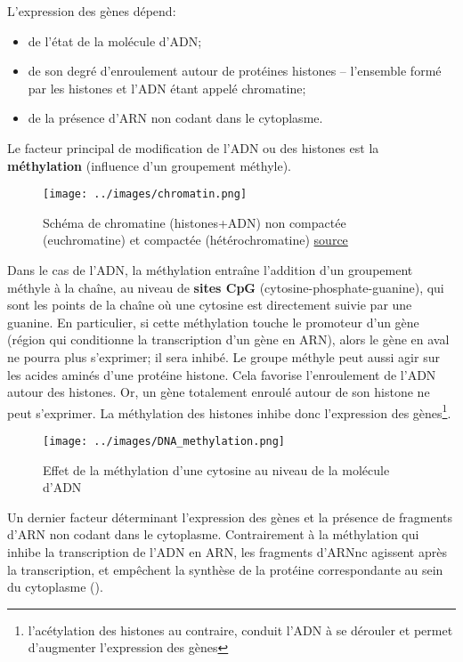 \documentclass[french]{article}
\begin{document}
				L'expression des gènes dépend:
				\begin{itemize}
					\item de l'état de la molécule d'ADN;
					\item de son degré d'enroulement autour de protéines histones -- l'ensemble formé par les histones et l'ADN étant appelé chromatine;
					\item de la présence d'ARN non codant dans le cytoplasme.
				\end{itemize}\vspace{3mm}

				Le facteur principal de modification de l'ADN ou des histones est la \textbf{méthylation} (influence d'un groupement méthyle).
				\begin{figure}[H]
					\centering
					\texttt{[image: ../images/chromatin.png]}
					\caption{Schéma de chromatine (histones+ADN) non compactée (euchromatine) et compactée (hétérochromatine) \href{https://nanobiologyhonoursprogrammeblog.wordpress.com/2018/04/18/3d-chromatin-conformation-in-disease-pathology/}{source}}
				\end{figure}
				Dans le cas de l'ADN, la méthylation entraîne l'addition d'un groupement méthyle à la chaîne, au niveau de \textbf{sites CpG} (cytosine-phosphate-guanine), qui sont les points de la chaîne où une cytosine est directement suivie par une guanine. En particulier, si cette méthylation touche le promoteur d'un gène (région qui conditionne la transcription d'un gène en ARN), alors le gène en aval ne pourra plus s'exprimer; il sera inhibé. Le groupe méthyle peut aussi agir sur les acides aminés d'une protéine histone. Cela favorise l'enroulement de l'ADN autour des histones. Or, un gène totalement enroulé autour de son histone ne peut s'exprimer. La méthylation des histones inhibe donc l'expression des gènes\footnote{l'acétylation des histones au contraire, conduit l'ADN à se dérouler et permet d'augmenter l'expression des gènes}.\\
				\begin{figure}[H]
					\centering
					\texttt{[image: ../images/DNA\_methylation.png]}
					\caption{Effet de la méthylation d'une cytosine au niveau de la molécule d'ADN}
				\end{figure}
			
				Un dernier facteur déterminant l'expression des gènes et la présence de fragments d'ARN non codant dans le cytoplasme. Contrairement à la méthylation qui inhibe la transcription de l'ADN en ARN, les fragments d'ARNnc agissent après la transcription, et empêchent la synthèse de la protéine correspondante au sein du cytoplasme (\cite{mansuy2016}). 
\end{document}

